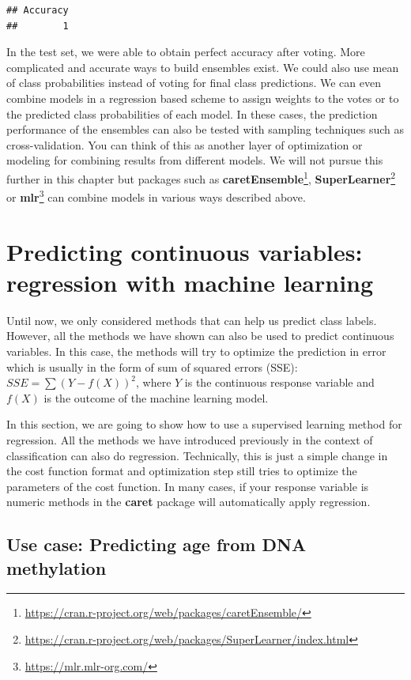 \documentclass[12pt,]{krantz}
\renewcommand{\href}[2]{#2\footnote{\url{#1}}}
\begin{document}
\begin{verbatim}
## Accuracy 
##        1
\end{verbatim}

In the test set, we were able to obtain perfect accuracy after voting. More complicated and accurate ways to build ensembles exist. We could also use mean of class probabilities instead of voting for final class predictions. We can even combine models in a regression based scheme to assign weights to the votes or to the predicted class probabilities of each model. In these cases, the prediction performance of the ensembles can also be tested with sampling techniques such as cross-validation. You can think of this as another layer of optimization or modeling for combining results from different models. We will not pursue this further in this chapter but packages such as \href{https://cran.r-project.org/web/packages/caretEnsemble/}{\textbf{caretEnsemble}}, \href{https://cran.r-project.org/web/packages/SuperLearner/index.html}{\textbf{SuperLearner}} or \href{https://mlr.mlr-org.com/}{\textbf{mlr}} can combine models in various ways described above.

\hypertarget{predicting-continuous-variables-regression-with-machine-learning}{%
\section{Predicting continuous variables: regression with machine learning}\label{predicting-continuous-variables-regression-with-machine-learning}}

Until now, we only considered methods that can help us predict class labels. However, all the methods we have shown can also be used to predict continuous variables. In this case, the methods will try to optimize the prediction in error which is usually in the form of sum of squared errors (SSE): \(SSE=\sum (Y-f(X))^2\), where \(Y\) is the continuous response variable and \(f(X)\) is the outcome of the machine learning model.

In this section, we are going to show how to use a supervised learning method for regression. All the methods we have introduced previously in the context of classification can also do regression. Technically, this is just a simple change in the cost function format and optimization step still tries to optimize the parameters of the cost function. In many cases, if your response variable is numeric methods in the \textbf{caret} package will automatically apply regression.

\hypertarget{use-case-predicting-age-from-dna-methylation}{%
\subsection{Use case: Predicting age from DNA methylation}\label{use-case-predicting-age-from-dna-methylation}}
\end{document}
